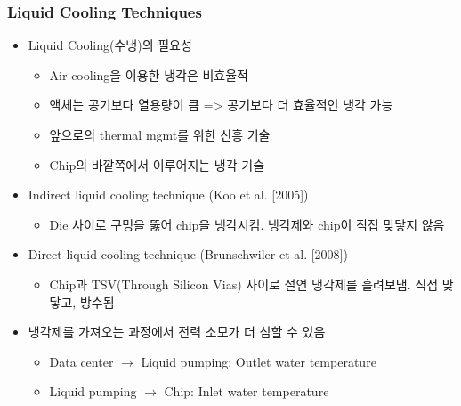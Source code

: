 \subsubsection*{Liquid Cooling Techniques}
\begin{itemize}
    \item Liquid Cooling(수냉)의 필요성
    \begin{itemize}
        \item Air cooling을 이용한 냉각은 비효율적
        \item 액체는 공기보다 열용량이 큼 => 공기보다 더 효율적인 냉각 가능
        \item 앞으로의 thermal mgmt를 위한 신흥 기술
        \item Chip의 바깥쪽에서 이루어지는 냉각 기술
    \end{itemize}
    \item Indirect liquid cooling technique (Koo et al. [2005])
    \begin{itemize}
        \item Die 사이로 구멍을 뚫어 chip을 냉각시킴. 냉각제와 chip이 직접 맞닿지 않음
    \end{itemize}
    \item Direct liquid cooling technique (Brunschwiler et al. [2008])
    \begin{itemize}
        \item Chip과 TSV(Through Silicon Vias) 사이로 절연 냉각제를 흘려보냄. 직접 맞닿고, 방수됨
    \end{itemize}
    \item 냉각제를 가져오는 과정에서 전력 소모가 더 심할 수 있음
    \begin{itemize}
        \item Data center $\rightarrow$ Liquid pumping: Outlet water temperature
        \item Liquid pumping $\rightarrow$ Chip: Inlet water temperature
    \end{itemize}
\end{itemize}
